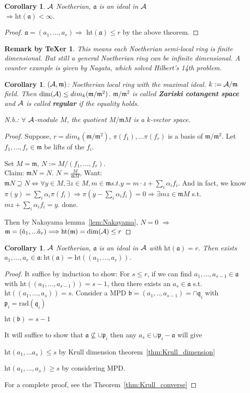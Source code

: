 \documentclass[11pt]{article}
\newtheorem{cor}[thm]{Corollary}
\newtheorem{rmkt}[thm]{Remark by TeXer}
\newcommand{\sca}{{\mathfrak a}}
\newcommand{\scb}{{\mathfrak b}}
\newcommand{\scm}{{\mathfrak m}}
\newcommand{\scp}{{\mathfrak p}}
\newcommand{\scq}{\mathfrak q}
\newcommand{\cala}{{\cal A}}
\newcommand{\Lrta}{\Longrightarrow}
\newcommand{\Llrta}{\Longleftrightarrow}
\begin{document}
\begin{cor}
$\cala$ Noetherian, $\sca$ is an ideal in $\cala$\\
$\Lrta \text{ht}(\sca)<\infty$.
\end{cor}
\begin{proof}
$\sca=(a_1,...,a_r)\Lrta$ $\text{ht}(\sca)\leq r$ by the above theorem.
\end{proof}
\begin{rmkt}
This means each Noetherian semi-local ring is finite dimensional. But still a general Noetherian ring can be infinite dimensional. A counter example is given by Nagata, which solved Hilbert's 14th problem.
\end{rmkt}
\begin{cor}
$(\cala,\scm)$: Noetherian local ring with the maximal ideal. $k:=\cala/\scm$ field. Then $\text{dim}(\cala)\leq dim_k(\scm/\scm^2)$. $\scm/\scm^2$ is called \textbf{Zariski cotangent space} and $\cala$ is called \textbf{regular} if the equality holds.

N.b.: $\forall$ $\cala$-module $M$, the quotient $M/\scm M$ is a $k$-vector space.
\end{cor}
\begin{proof}
Suppose, $r=dim_k(\scm/\scm^2)$, $\pi(f_1),...\pi(f_r)$ is a basis of $\scm/\scm^2$. Let $f_1,...,f_r\in\scm$ be lifts of the $f_i$. 

Set $M=\scm$, $N:=M/(f_1,...,f_r)$.\\
Claim: $\scm N=N$.
 $N=\frac{M}{\scm M}$, Want: $\scm N\supseteq N\Llrta\forall y\in M,\exists z\in M, m\in\scm s.t. y=m\cdot z+\sum_i\alpha_i f_i$. And in fact, we know $\pi(y)=\sum_i\alpha_i\pi(f_i)\Lrta \pi(y-\sum_i\alpha_if_i)=0\Lrta \exists mz\in \scm M$ s.t. $mz+\sum_i\alpha_i f_i=y$. done.

Then by Nakayama lemma~\ref{lem:Nakayama}, $N=0$ $\Lrta$ $\scm=(\tilde{a}_1,...\tilde{a}_r)\Lrta \text{ht}(\scm)=\text{dim}(\cala)\leq r$
\end{proof}

\begin{cor}
$\cala$ Noetherian, $\sca$ is an ideal in $\cala$ with $\text{ht}(\sca)=r$. Then exists $a_1,...,a_r\in\sca:\text{ht}(\sca)=\text{ht}((a_1,...,a_r))$.
\end{cor}
\begin{proof}
It suffice by induction to show: For $s\leq r$, if we can find $a_1,...,a_{s-1}\in\sca$ with $\text{ht}((a_1,...,a_{s-1}))=s-1$, then there exists an $a_s\in\sca$ s.t. $\text{ht}((a_1,...,a_s))=s$.
Consider a MPD $\scb=(a_1,..,a_{s-1})=\cap\scq_i$ with $\scp_i=\text{rad}(\scq_i)$

$\text{ht}(\scb)=s-1$

It will suffice to show that $\sca\not\subseteq \cup\scp_i $
then any $a_s\in\cup \scp_i-\sca$ will give 

$\text{ht}(a_1,...a_s)\leq s$ by Krull dimension theorem~\ref{thm:Krull_dimension}

$\text{ht}(a_1,...,a_s)\geq s$ by considering MPD.

For a complete proof, see the Theorem~\ref{thm:Krull_converse}
\end{proof}
\end{document}
